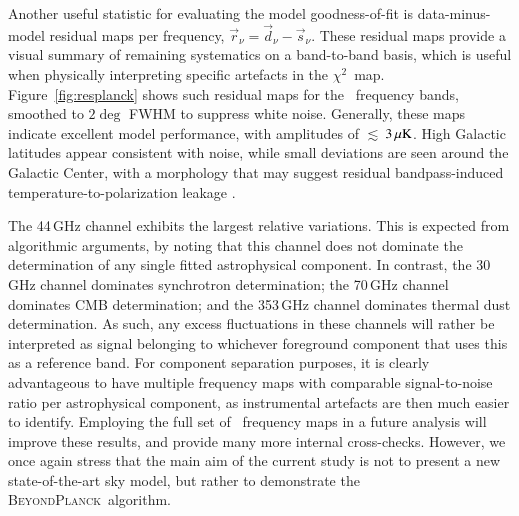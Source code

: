\documentclass[twocolumn]{aa}
\def\chisq{$\chi^2$}
\renewcommand{\d}[0]{\vec{d}}
\newcommand{\s}[0]{\vec{s}}
\renewcommand{\r}[0]{\vec{r}}
\newcommand{\BP}{\textsc{BeyondPlanck}}
\newcommand{\?}[1]{\textcolor{red}{{\bf [#1]}}}
\begin{document}
Another useful statistic for evaluating the model goodness-of-fit is
data-minus-model residual maps per frequency,
${\r_{\nu}=\d_{\nu}-\s_{\nu}}$. These residual maps provide a visual
summary of remaining systematics on a band-to-band basis, which is
useful when physically interpreting specific artefacts in the
\chisq\ map. Figure~\ref{fig:resplanck} shows such residual maps for
the \Planck\ frequency bands, smoothed to $2\deg$ FWHM to suppress
white noise. Generally, these maps indicate excellent model
performance, with amplitudes of $\lesssim\,$$3\muK$. High
Galactic latitudes appear consistent with noise, while small
deviations are seen around the Galactic Center, with a morphology that
may suggest residual bandpass-induced temperature-to-polarization
leakage \citep{bp12}.

The 44\,GHz channel exhibits the largest relative variations. This is expected
from algorithmic arguments, by noting that this channel does not dominate the
determination of any single fitted astrophysical component. In contrast, the
30\,GHz channel dominates synchrotron determination; the 70\,GHz channel
dominates CMB determination; and the 353\,GHz channel dominates thermal dust
determination. As such, any excess fluctuations in these channels will rather be
interpreted as signal belonging to whichever foreground component that uses this
as a reference band. For component separation purposes, it is clearly
advantageous to have multiple frequency maps with comparable signal-to-noise
ratio per astrophysical component, as instrumental artefacts are then much
easier to identify. Employing the full set of \Planck\ frequency maps in a
future analysis will improve these results, and provide many more internal
cross-checks. However, we once again stress that the main aim of the current
study is not to present a new state-of-the-art sky model, but rather to demonstrate
the \BP\ algorithm.
\end{document}
